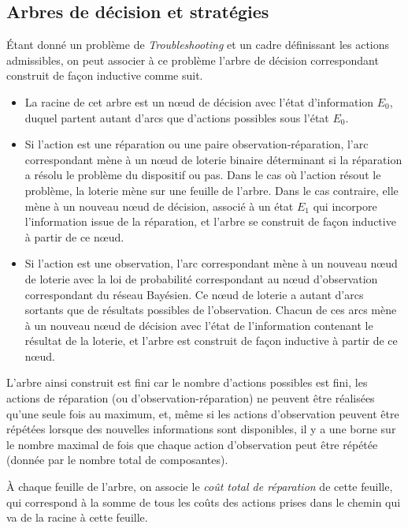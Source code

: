 \documentclass[a4paper,11pt]{article}
\theoremstyle{plain}
\theoremstyle{definition}
\begin{document}
\subsection{Arbres de décision et stratégies}
\label{SecAbresEtStrategies}

Étant donné un problème de \emph{Troubleshooting} et un cadre définissant les actions admissibles, on peut associer à ce problème l'arbre de décision correspondant construit de façon inductive comme suit.

\begin{itemize}
\item La racine de cet arbre est un nœud de décision avec l'état d'information $E_0$, duquel partent autant d'arcs que d'actions possibles sous l'état $E_0$.

\item Si l'action est une réparation ou une paire observation-réparation, l'arc correspondant mène à un nœud de loterie binaire déterminant si la réparation a résolu le problème du dispositif ou pas. Dans le cas où l'action résout le problème, la loterie mène sur une feuille de l'arbre. Dans le cas contraire, elle mène à un nouveau nœud de décision, associé à un état $E_1$ qui incorpore l'information issue de la réparation, et l'arbre se construit de façon inductive à partir de ce nœud.

\item Si l'action est une observation, l'arc correspondant mène à un nouveau nœud de loterie avec la loi de probabilité correspondant au nœud d'observation correspondant du réseau Bayésien. Ce nœud de loterie a autant d'arcs sortants que de résultats possibles de l'observation. Chacun de ces arcs mène à un nouveau nœud de décision avec l'état de l'information contenant le résultat de la loterie, et l'arbre est construit de façon inductive à partir de ce nœud.
\end{itemize}

L'arbre ainsi construit est fini car le nombre d'actions possibles est fini, les actions de réparation (ou d'observation-réparation) ne peuvent être réalisées qu'une seule fois au maximum, et, même si les actions d'observation peuvent être répétées lorsque des nouvelles informations sont disponibles, il y a une borne sur le nombre maximal de fois que chaque action d'observation peut être répétée (donnée par le nombre total de composantes).

À chaque feuille de l'arbre, on associe le \emph{coût total de réparation} de cette feuille, qui correspond à la somme de tous les coûts des actions prises dans le chemin qui va de la racine à cette feuille.
\end{document}
